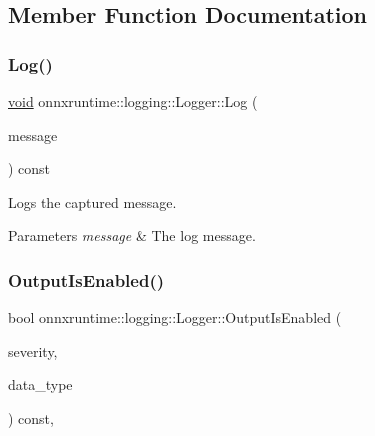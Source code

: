 \subsection{Member Function Documentation}
\mbox{\label{classonnxruntime_1_1logging_1_1Logger_a72e6467ee8cede10dbc9d2aea649f8fe}} 
\subsubsection{\texorpdfstring{Log()}{Log()}}
{\footnotesize\ttfamily \mbox{\hyperlink{mlasi_8h_a88f941d423cb2a819b70a1358982b1a6}{void}} onnxruntime\+::logging\+::\+Logger\+::\+Log (\begin{DoxyParamCaption}\item[{const \mbox{\hyperlink{classonnxruntime_1_1logging_1_1Capture}{Capture}} \&}]{message }\end{DoxyParamCaption}) const\hspace{0.3cm}{\ttfamily [inline]}}

Logs the captured message. 
\begin{DoxyParams}{Parameters}
{\em message} & The log message. \\
\hline
\end{DoxyParams}
\mbox{\label{classonnxruntime_1_1logging_1_1Logger_ac42898a3e3c2623280b244180f28490d}} 
\subsubsection{\texorpdfstring{Output\+Is\+Enabled()}{OutputIsEnabled()}}
{\footnotesize\ttfamily bool onnxruntime\+::logging\+::\+Logger\+::\+Output\+Is\+Enabled (\begin{DoxyParamCaption}\item[{\mbox{\hyperlink{namespaceonnxruntime_1_1logging_a7daeb33e1b0e6a6df8c23d142af78e81}{Severity}}}]{severity,  }\item[{\mbox{\hyperlink{namespaceonnxruntime_1_1logging_a7342198e47b8ad2717a5d6e28cf68951}{Data\+Type}}}]{data\+\_\+type }\end{DoxyParamCaption}) const\hspace{0.3cm}{\ttfamily [inline]}, {\ttfamily [noexcept]}}


